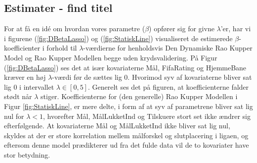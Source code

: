 \documentclass[11pt,a4paper]{article}
\begin{document}
\subsection{Estimater - find titel}
For at få en idé om hvordan vores parametre ($\beta$) opfører sig for givne $\lambda$'er, har vi i figurene (\ref{fig:DBetaLasso}) og (\ref{fig:StatiskLine}) visualiseret de estimerede $\beta$-koefficienter i forhold til $\lambda$-værdierne for henholdsvis Den Dynamiske Rao Kupper Model og Rao Kupper Modellen  begge uden krydsvalidering. På Figur (\ref{fig:DBetaLasso}) ses det at især kovariaterne Mål, FifaRating og HjemmeBane kræver en høj $\lambda$-værdi før de sættes lig 0. Hvorimod syv af kovariaterne bliver sat lig 0 i intervallet $\lambda \in [0,5]$. Generelt ses det på figuren, at koefficienterne falder stødt når $\lambda$ stiger. Koefficienterne for (den generelle) Rao Kupper Modellen i Figur  \ref{fig:StatiskLine}, er mere delte, i form af at syv af parametrene bliver sat lig nul for $\lambda<1$, hvorefter Mål, MålLukketInd og Tilskuere stort set ikke ændrer sig efterfølgende. At kovariaterne Mål og MålLukketInd ikke bliver sat lig nul, skyldes at der er store korrelation mellem målforskel og slutplacering i ligaen, og eftersom denne model prædikterer ud fra det fulde data vil de to kovariater have stor betydning.
\end{document}
